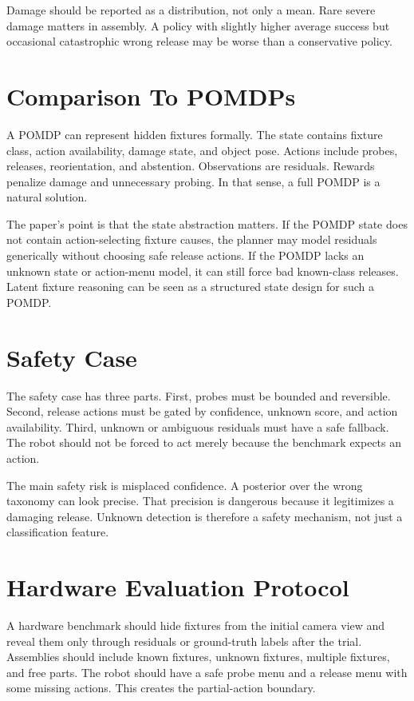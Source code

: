 \documentclass{article}
\begin{document}
Damage should be reported as a distribution, not only a mean. Rare severe
damage matters in assembly. A policy with slightly higher average success but
occasional catastrophic wrong release may be worse than a conservative policy.

\section{Comparison To POMDPs}

A POMDP can represent hidden fixtures formally. The state contains fixture
class, action availability, damage state, and object pose. Actions include
probes, releases, reorientation, and abstention. Observations are residuals.
Rewards penalize damage and unnecessary probing. In that sense, a full POMDP
is a natural solution.

The paper's point is that the state abstraction matters. If the POMDP state
does not contain action-selecting fixture causes, the planner may model
residuals generically without choosing safe release actions. If the POMDP lacks
an unknown state or action-menu model, it can still force bad known-class
releases. Latent fixture reasoning can be seen as a structured state design
for such a POMDP.

\section{Safety Case}

The safety case has three parts. First, probes must be bounded and reversible.
Second, release actions must be gated by confidence, unknown score, and action
availability. Third, unknown or ambiguous residuals must have a safe fallback.
The robot should not be forced to act merely because the benchmark expects an
action.

The main safety risk is misplaced confidence. A posterior over the wrong
taxonomy can look precise. That precision is dangerous because it legitimizes
a damaging release. Unknown detection is therefore a safety mechanism, not
just a classification feature.

\section{Hardware Evaluation Protocol}

A hardware benchmark should hide fixtures from the initial camera view and
reveal them only through residuals or ground-truth labels after the trial.
Assemblies should include known fixtures, unknown fixtures, multiple fixtures,
and free parts. The robot should have a safe probe menu and a release menu with
some missing actions. This creates the partial-action boundary.
\end{document}
